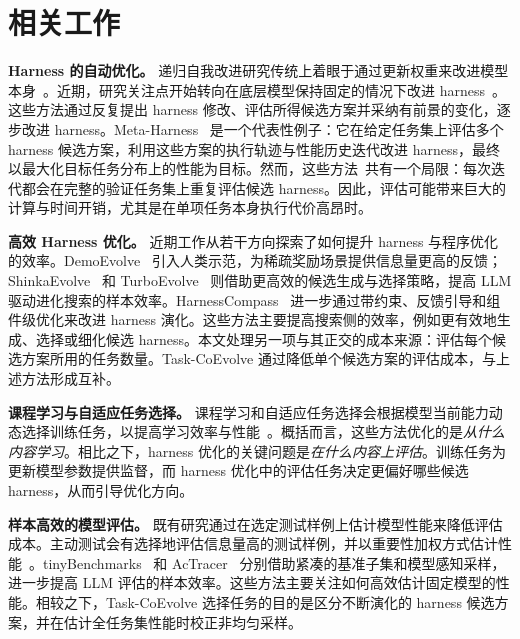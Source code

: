 \documentclass{article}
\begin{document}
\section{相关工作}
\label{sec:related_work}

\textbf{Harness 的自动优化。}
递归自我改进研究传统上着眼于通过更新权重来改进模型本身~\citep{huang-etal-2023-large, pmlr-v235-yuan24d, NEURIPS2025_6b41e04c, NEURIPS2022_639a9a17}。近期，研究关注点开始转向在底层模型保持固定的情况下改进 harness~\citep{lee2026meta, lin2026agentic, nie2026tthe, zhang2026harnessing}。这些方法通过反复提出 harness 修改、评估所得候选方案并采纳有前景的变化，逐步改进 harness。Meta-Harness~\citep{lee2026meta} 是一个代表性例子：它在给定任务集上评估多个 harness 候选方案，利用这些方案的执行轨迹与性能历史迭代改进 harness，最终以最大化目标任务分布上的性能为目标。然而，这些方法~\citep{lee2026meta, lin2026agentic, zhang2026harnessing}共有一个局限：每次迭代都会在完整的验证任务集上重复评估候选 harness。因此，评估可能带来巨大的计算与时间开销，尤其是在单项任务本身执行代价高昂时。

\textbf{高效 Harness 优化。}
近期工作从若干方向探索了如何提升 harness 与程序优化的效率。DemoEvolve~\citep{che2026demoevolve} 引入人类示范，为稀疏奖励场景提供信息量更高的反馈；ShinkaEvolve~\citep{lange2025shinkaevolve} 和 TurboEvolve~\citep{yang2026turboevolve} 则借助更高效的候选生成与选择策略，提高 LLM 驱动进化搜索的样本效率。HarnessCompass~\citep{zhang2026harnesscompass} 进一步通过带约束、反馈引导和组件级优化来改进 harness 演化。这些方法主要提高搜索侧的效率，例如更有效地生成、选择或细化候选 harness。本文处理另一项与其正交的成本来源：评估每个候选方案所用的任务数量。Task-CoEvolve 通过降低单个候选方案的评估成本，与上述方法形成互补。

\textbf{课程学习与自适应任务选择。}
课程学习和自适应任务选择会根据模型当前能力动态选择训练任务，以提高学习效率与性能~\citep{bengio_curriculum, ruvolo2013active, soviany2022curriculum}。概括而言，这些方法优化的是\emph{从什么内容学习}。相比之下，harness 优化的关键问题是\emph{在什么内容上评估}。训练任务为更新模型参数提供监督，而 harness 优化中的评估任务决定更偏好哪些候选 harness，从而引导优化方向。

\textbf{样本高效的模型评估。}
既有研究通过在选定测试样例上估计模型性能来降低评估成本。主动测试会有选择地评估信息量高的测试样例，并以重要性加权方式估计性能~\citep{kossen21a2021active}。tinyBenchmarks~\citep{polo2024tiny} 和 AcTracer~\citep{huang2026actracer} 分别借助紧凑的基准子集和模型感知采样，进一步提高 LLM 评估的样本效率。这些方法主要关注如何高效估计固定模型的性能。相较之下，Task-CoEvolve 选择任务的目的是区分不断演化的 harness 候选方案，并在估计全任务集性能时校正非均匀采样。
\end{document}
